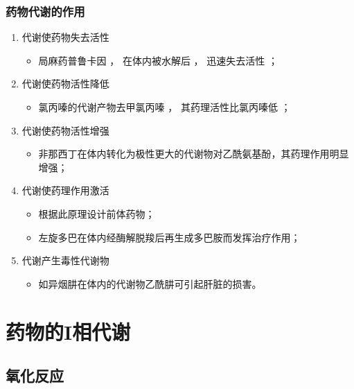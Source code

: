 \documentclass[dvipsnames, svgnames, x11names]{beamer}
\begin{document}
\begin{frame}
    \frametitle{药物代谢的作用}
  \begin{enumerate}
    \item 代谢使药物失去活性
      \begin{itemize}
        \item 局麻药普鲁卡因 ， 在体内被水解后 ， 迅速失去活性 ；
      \end{itemize}
    \item 代谢使药物活性降低
      \begin{itemize}
        \item 氯丙嗪的代谢产物去甲氯丙嗪 ， 其药理活性比氯丙嗪低 ；
      \end{itemize}
    \item 代谢使药物活性增强
      \begin{itemize}
        \item 非那西丁在体内转化为极性更大的代谢物对乙酰氨基酚，其药理作用明显增强；
      \end{itemize}
    \item 代谢使药理作用激活
      \begin{itemize}
        \item 根据此原理设计前体药物；
        \item 左旋多巴在体内经酶解脱羧后再生成多巴胺而发挥治疗作用；
      \end{itemize}
    \item 代谢产生毒性代谢物
      \begin{itemize}
        \item 如异烟肼在体内的代谢物乙酰肼可引起肝脏的损害。
      \end{itemize}
  \end{enumerate}
\end{frame}


\section{药物的I相代谢}

\subsection{氧化反应}
\end{document}
